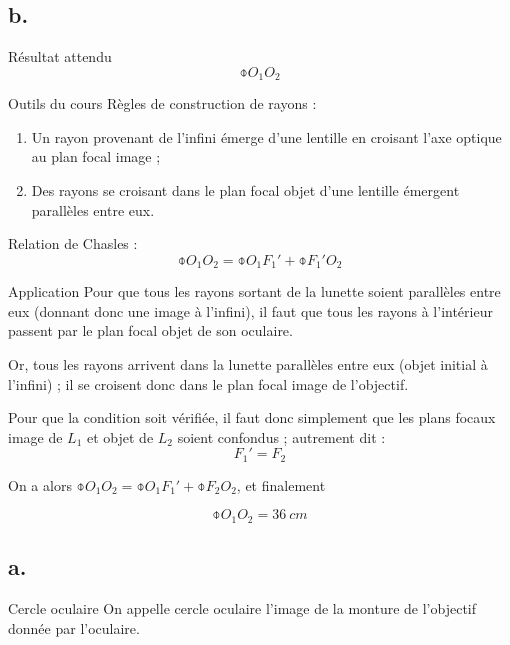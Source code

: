 \documentclass[../main/main.tex]{subfiles}
\begin{document}
\setcounter{subsection}{1}
\subsection{b.}
\begin{NCprop}{Résultat attendu}
    $$\obar{O_1O_2}$$
\end{NCprop}

\begin{NCdemo}{Outils du cours}
    Règles de construction de rayons :
    \begin{enumerate}

        \item Un rayon provenant de l'infini émerge d'une lentille en croisant
            l'axe optique au plan focal image ;

        \item Des rayons se croisant dans le plan focal objet d'une lentille
            émergent parallèles entre eux.
    \end{enumerate}
    Relation de Chasles :
    \[ \obar{O_1O_2} = \obar{O_1F_1'} + \obar{F_1'O_2} \]
\end{NCdemo}

\begin{NCexem}{Application}
    Pour que tous les rayons sortant de la lunette soient parallèles entre eux
    (donnant donc une image à l'infini), il faut que tous les rayons à
    l'intérieur passent par le plan focal objet de son oculaire.\bigbreak

    Or, tous les rayons arrivent dans la lunette parallèles entre eux (objet
    initial à l'infini) ; il se croisent donc dans le plan focal image de
    l'objectif. \bigbreak

    Pour que la condition soit vérifiée, il faut donc simplement que les plans
    focaux image de $L_1$ et objet de $L_2$ soient confondus ; autrement dit :
    \[ \boxed{F_1' = F_2} \]
    
    On a alors $\obar{O_1O_2} = \obar{O_1F_1'} + \obar{F_2O_2}$, et finalement

    \[ \boxed{\obar{O_1O_2} = \SI{+36}{cm}} \]
\end{NCexem}

\subsection{a.}
\begin{defi}{Cercle oculaire}
    On appelle cercle oculaire l'image de la monture de l'objectif donnée par
    l'oculaire.
\end{defi}
\end{document}
